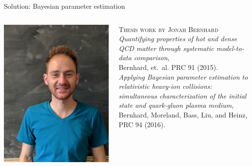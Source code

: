 \documentclass{beamer}
\begin{document}
\begin{frame}{Solution: Bayesian parameter estimation}
  \begin{columns}[T]
    \begin{column}{0.25\textwidth}
      \includegraphics[width=.9\columnwidth]{jonah}
    \end{column}
    \begin{column}{.75\textwidth}
      {\scshape \color{theme} Thesis work by Jonah Bernhard} \\[1ex]
      \scriptsize
      \emph{Quantifying properties of hot and dense QCD matter through systematic model-to-data comparison},\\[.5ex]
      Bernhard, et.\ al. PRC 91 (2015). \\[2ex]
      \emph{Applying Bayesian parameter estimation to relativistic heavy-ion collisions: simultaneous characterization of the initial state and quark-gluon plasma medium},\\[.5ex]
      Bernhard, Moreland, Bass, Liu, and Heinz, PRC 94 (2016).
    \end{column}
  \end{columns}

\end{frame}
\end{document}
